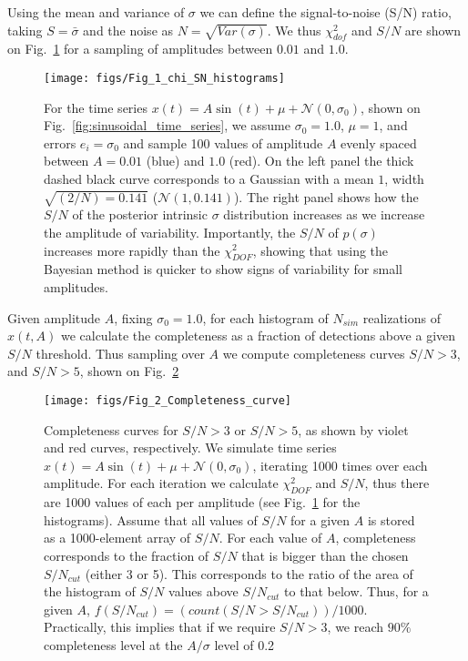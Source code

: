 \documentclass[fleqn,usenatbib]{mnras}  %
\begin{document}
Using the mean and variance of $\sigma$ we can define the signal-to-noise (S/N) ratio, taking  $S= \bar{\sigma}$ and the noise as $N = \sqrt{Var(\sigma)}$. We thus $\chi^{2}_{dof}$ and $S/N$ are shown on Fig.~\ref{fig:chi2_and_SN} for a sampling of amplitudes between $0.01$ and $1.0$.  

\begin{figure}
 \texttt{[image: figs/Fig\_1\_chi\_SN\_histograms]}
 \caption{For the time series $x(t) = A \sin{(t)}+\mu+\mathcal{N}(0,\sigma_{0})$, shown on Fig.~\ref{fig:sinusoidal_time_series}, we assume $\sigma_{0}=1.0$, $\mu=1$, and errors $e_{i} = \sigma_{0}$ and sample 100 values of amplitude $A$ evenly spaced between $A=0.01$ (blue) and $1.0$ (red). On the left panel the thick dashed black curve corresponds to a Gaussian  with a mean $1$, width $\sqrt{(2/N) = 0.141}$  ($\mathcal{N}(1,0.141)$). The right panel shows how the $S/N$ of the posterior intrinsic $\sigma$ distribution increases as we increase the amplitude of variability. Importantly, the  $S/N$ of $p(\sigma)$ increases more rapidly than the $\chi^{2}_{DOF}$, showing that using the Bayesian method is quicker to show signs of variability for small amplitudes. }
 \label{fig:chi2_and_SN}
\end{figure}

Given amplitude $A$, fixing $\sigma_{0} =1.0$,  for each histogram of $N_{sim}$ realizations of $x(t,A)$   we calculate the completeness as a  fraction of detections above a given $S/N$ threshold. Thus sampling over $A$ we compute completeness curves $S/N > 3$, and $S/N > 5$, shown on Fig.~\ref{fig:completeness_curve}


\begin{figure}
  \texttt{[image: figs/Fig\_2\_Completeness\_curve]}
  \caption{Completeness curves for $S/N > 3$ or $S/N > 5$, as shown by violet and red curves, respectively. We simulate time series $x(t) = A \sin{(t)}+\mu+\mathcal{N}(0,\sigma_{0})$, iterating 1000 times over each amplitude. For each iteration we calculate $\chi^{2}_{DOF}$ and $S/N$, thus there are 1000 values of each per amplitude (see Fig.~\ref{fig:chi2_and_SN}  for the histograms).  Assume that all values of $S/N$ for a given $A$ is stored as a 1000-element array of $S/N$. For each value of $A$, completeness corresponds to the fraction of $S/N$ that is bigger than the chosen  $S/N_{cut}$ (either 3 or 5). This corresponds to the ratio of the area of the histogram of $S/N$ values  above  $S/N_{cut}$  to that below. Thus, for a given $A$,  $f(S/N_{cut}) = (count(S/N > S/N_{cut})) / 1000$. Practically, this implies that if we require $S/N > 3$, we reach $90\%$ completeness level at the $A/\sigma$ level of 0.2}
  \label{fig:completeness_curve}
\end{figure}
\end{document}
